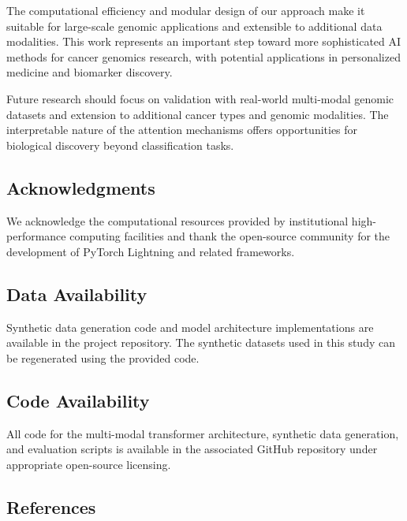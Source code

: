 The computational efficiency and modular design of our approach make it
suitable for large-scale genomic applications and extensible to
additional data modalities. This work represents an important step
toward more sophisticated AI methods for cancer genomics research, with
potential applications in personalized medicine and biomarker discovery.

Future research should focus on validation with real-world multi-modal
genomic datasets and extension to additional cancer types and genomic
modalities. The interpretable nature of the attention mechanisms offers
opportunities for biological discovery beyond classification tasks.

\subsection{Acknowledgments}\label{acknowledgments}

We acknowledge the computational resources provided by institutional
high-performance computing facilities and thank the open-source
community for the development of PyTorch Lightning and related
frameworks.

\subsection{Data Availability}\label{data-availability}

Synthetic data generation code and model architecture implementations
are available in the project repository. The synthetic datasets used in
this study can be regenerated using the provided code.

\subsection{Code Availability}\label{code-availability}

All code for the multi-modal transformer architecture, synthetic data
generation, and evaluation scripts is available in the associated GitHub
repository under appropriate open-source licensing.

\subsection{References}\label{references}

